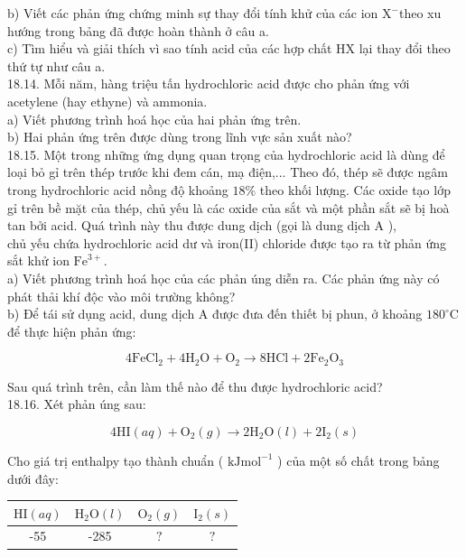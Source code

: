 \documentclass[10pt]{article}
\begin{document}
b) Viết các phản ứng chứng minh sự thay đổi tính khử của các ion $\mathrm{X}^{-}$theo xu hướng trong bảng đã được hoàn thành ở câu a.\\
c) Tìm hiểu và giải thích vì sao tính acid của các hợp chất HX lại thay đổi theo thứ tự như câu a.\\
18.14. Mỗi năm, hàng triệu tấn hydrochloric acid được cho phản ứng với acetylene (hay ethyne) và ammonia.\\
a) Viết phương trình hoá học của hai phản ứng trên.\\
b) Hai phản ứng trên được dùng trong lĩnh vực sản xuất nào?\\
18.15. Một trong những ứng dụng quan trọng của hydrochloric acid là dùng để loại bỏ gỉ trên thép trước khi đem cán, mạ điện,... Theo đó, thép sẽ được ngâm trong hydrochloric acid nồng độ khoảng $18 \%$ theo khối lượng. Các oxide tạo lớp gỉ trên bề mặt của thép, chủ yếu là các oxide của sắt và một phần sắt sẽ bị hoà tan bởi acid. Quá trình này thu được dung dịch (gọi là dung dịch A ),\\
chủ yếu chứa hydrochloric acid dư và iron(II) chloride được tạo ra từ phản ứng sắt khử ion $\mathrm{Fe}^{3+}$.\\
a) Viết phương trình hoá học của các phản úng diễn ra. Các phản ứng này có phát thải khí độc vào môi trường không?\\
b) Để tái sử dụng acid, dung dịch A được đưa đến thiết bị phun, ở khoảng $180^{\circ} \mathrm{C}$ để thực hiện phản ứng:

$$
4 \mathrm{FeCl}_{2}+4 \mathrm{H}_{2} \mathrm{O}+\mathrm{O}_{2} \rightarrow 8 \mathrm{HCl}+2 \mathrm{Fe}_{2} \mathrm{O}_{3}
$$

Sau quá trình trên, cần làm thế nào để thu được hydrochloric acid?\\
18.16. Xét phản úng sau:

$$
4 \mathrm{HI}(a q)+\mathrm{O}_{2}(g) \rightarrow 2 \mathrm{H}_{2} \mathrm{O}(l)+2 \mathrm{I}_{2}(s)
$$

Cho giá trị enthalpy tạo thành chuẩn ( $\mathrm{kJ} \mathrm{mol}^{-1}$ ) của một số chất trong bảng dưới đây:

\begin{center}
\begin{tabular}{|c|c|c|c|}
\hline
$\mathrm{HI}(a q)$ & $\mathrm{H}_{2} \mathrm{O}(l)$ & $\mathrm{O}_{2}(g)$ & $\mathrm{I}_{2}(s)$ \\
\hline
-55 & -285 & $?$ & $?$ \\
\hline
\end{tabular}
\end{center}
\end{document}
